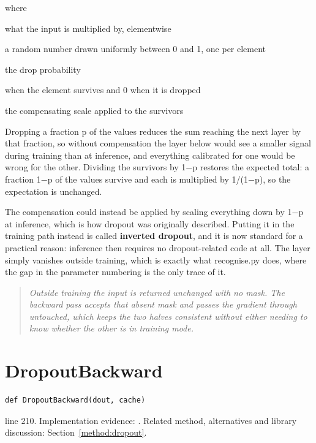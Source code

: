 \noindent where
\begin{description}[leftmargin=2.4em,style=nextline,font=\normalfont\ttfamily]\setlength\itemsep{1pt}
  \item[{$\mathrm{mask}$}] \normalfont what the input is multiplied by, elementwise
  \item[{$u$}] \normalfont a random number drawn uniformly between 0 and 1, one per element
  \item[{$p$}] \normalfont the drop probability
  \item[{$[\,u \ge p\,]$}]  when the element survives and 0 when it is dropped
  \item[{$\frac{1}{1-p}$}] \normalfont the compensating scale applied to the survivors
\end{description}
Dropping a fraction p of the values reduces the sum reaching the next layer by that fraction, so without compensation the layer below would see a smaller signal during training than at inference, and everything calibrated for one would be wrong for the other. Dividing the survivors by 1$-$p restores the expected total: a fraction 1$-$p of the values survive and each is multiplied by 1/(1$-$p), so the expectation is unchanged.


The compensation could instead be applied by scaling everything down by 1$-$p at inference, which is how dropout was originally described. Putting it in the training path instead is called \textbf{inverted dropout}, and it is now standard for a practical reason: inference then requires no dropout-related code at all. The layer simply vanishes outside training, which is exactly what recognise.py does, where the gap in the parameter numbering is the only trace of it.


\begin{quote}\small\itshape Outside training the input is returned unchanged with no mask. The backward pass accepts that absent mask and passes the gradient through untouched, which keeps the two halves consistent without either needing to know whether the other is in training mode.\end{quote}


\section{DropoutBackward}\label{fn:train:DropoutBackward}
\begin{lstlisting}[style=sig]
def DropoutBackward(dout, cache)
\end{lstlisting}
 line 210. Implementation evidence: \cite{code2026}. Related method, alternatives and library discussion: Section~\ref{method:dropout}.


